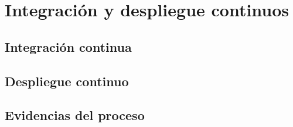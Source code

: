 \chapter{Integración y despliegue continuos}
\label{cap:cicd}

\section{Integración continua}

\section{Despliegue continuo}

\section{Evidencias del proceso}
